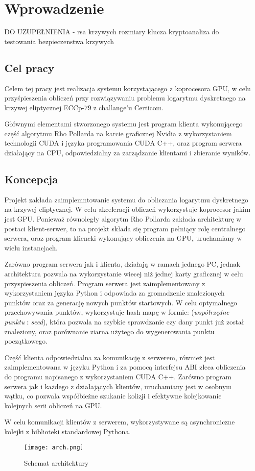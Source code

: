 \newpage
\section{Wprowadzenie}
DO UZUPEŁNIENIA - rsa krzywych rozmiary klucza kryptoanaliza do testowania bezpieczenstwa krzywych
\subsection{Cel pracy}
Celem tej pracy jest realizacja systemu korzystającego z koprocesora GPU,
w celu przyśpieszenia obliczeń przy
rozwiązywaniu problemu logarytmu dyskretnego na krzywej eliptycznej ECCp-79 z challange'u Certicom.
\par
Głównymi elementami stworzonego systemu
jest program klienta wykonującego część algorytmu Rho Pollarda na karcie graficznej Nvidia
z wykorzystaniem technologii CUDA i języka programowania CUDA C++,
oraz program serwera działający na CPU, odpowiedzialny za zarządzanie klientami i zbieranie wyników.

\subsection{Koncepcja}
Projekt zakłada zaimplemntowanie systemu do obliczania logarytmu dyskretnego na krzywej eliptycznej.
W celu akceleracji obliczeń wykorzystuje koprocesor jakim jest GPU. Ponieważ równoległy algorytm Rho Pollarda
zakłada architekturę w postaci klient-serwer, to na projekt składa się program pełniący rolę centralnego serwera,
oraz program kliencki wykonujący obliczenia na GPU, uruchamiany w wielu instancjach.
\par
Zarówno program serwera jak i klienta, działają w ramach jednego PC, jednak architektura pozwala na wykorzystanie
wiecej niż jednej karty graficznej w celu przyspieszenia obliczeń.
Program serwera jest zaimplementowany z wykorzystaniem języka Python i odpowiada za gromadzenie znalezionych
punktów oraz za generację nowych punktów startowych. W celu optymalnego przechowywania punktów, wykorzystuje
hash mapę w formie: (\textit{współrzędne punktu} : \textit{seed}), która pozwala na szybkie sprawdzanie czy dany punkt już został znaleziony,
oraz porównanie ziarna użytego do wygenerowania punktu początkowego.
\par
Część klienta odpowiedzialna za komunikację z serwerem,
również jest zaimplementowana w języku Python i za pomocą interfejsu ABI zleca obliczenia do programu napisanego z wykorzystaniem
CUDA C++. Zarówno program serwera jak i każdego z działających klientów, uruchamiany jest w osobnym wątku, co pozwala współbieżne szukanie kolizji i efektywne
kolejkowanie kolejnych serii obliczeń na GPU.
\par
W celu komunikacji klientów z serwerem, wykorzystywane są asynchroniczne kolejki z biblioteki standardowej Pythona.
\begin{figure}[!h]
    \centering \texttt{[image: arch.png]}
    \caption{Schemat architektury}
\end{figure}